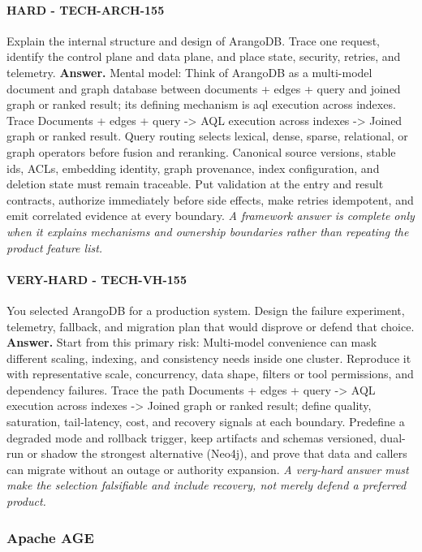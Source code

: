 \paragraph{HARD - TECH-ARCH-155} Explain the internal structure and design of ArangoDB. Trace one request, identify the control plane and data plane, and place state, security, retries, and telemetry.
\textbf{Answer.} Mental model: Think of ArangoDB as a multi-model document and graph database between documents + edges + query and joined graph or ranked result; its defining mechanism is aql execution across indexes. Trace Documents + edges + query -> AQL execution across indexes -> Joined graph or ranked result. Query routing selects lexical, dense, sparse, relational, or graph operators before fusion and reranking. Canonical source versions, stable ids, ACLs, embedding identity, graph provenance, index configuration, and deletion state must remain traceable. Put validation at the entry and result contracts, authorize immediately before side effects, make retries idempotent, and emit correlated evidence at every boundary.
\textit{A framework answer is complete only when it explains mechanisms and ownership boundaries rather than repeating the product feature list.}
\paragraph{VERY-HARD - TECH-VH-155} You selected ArangoDB for a production system. Design the failure experiment, telemetry, fallback, and migration plan that would disprove or defend that choice.
\textbf{Answer.} Start from this primary risk: Multi-model convenience can mask different scaling, indexing, and consistency needs inside one cluster. Reproduce it with representative scale, concurrency, data shape, filters or tool permissions, and dependency failures. Trace the path Documents + edges + query -> AQL execution across indexes -> Joined graph or ranked result; define quality, saturation, tail-latency, cost, and recovery signals at each boundary. Predefine a degraded mode and rollback trigger, keep artifacts and schemas versioned, dual-run or shadow the strongest alternative (Neo4j), and prove that data and callers can migrate without an outage or authority expansion.
\textit{A very-hard answer must make the selection falsifiable and include recovery, not merely defend a preferred product.}
\subsubsection*{Apache AGE}
